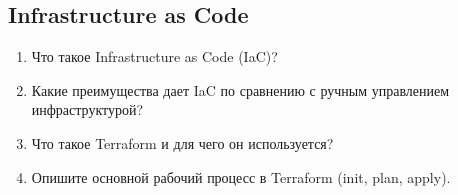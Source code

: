 \documentclass[12pt,a4paper]{article}
\begin{document}
    \subsection{Infrastructure as Code}
    \begin{enumerate}
        \item Что такое Infrastructure as Code (IaC)?
        \item Какие преимущества дает IaC по сравнению с ручным управлением инфраструктурой?
        \item Что такое Terraform и для чего он используется?
        \item Опишите основной рабочий процесс в Terraform (init, plan, apply).
    \end{enumerate}
\end{document}
